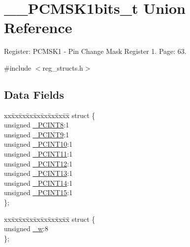 \hypertarget{union_____p_c_m_s_k1bits__t}{\section{\+\_\+\+\_\+\+P\+C\+M\+S\+K1bits\+\_\+t Union Reference}
\label{union_____p_c_m_s_k1bits__t}
}


Register\+: P\+C\+M\+S\+K1 -\/ Pin Change Mask Register 1. Page\+: 63.  




{\ttfamily \#include $<$reg\+\_\+structs.\+h$>$}

\subsection*{Data Fields}
\begin{DoxyCompactItemize}
\item 
\begin{tabbing}
xx\=xx\=xx\=xx\=xx\=xx\=xx\=xx\=xx\=\kill
struct \{\\
\>unsigned \hyperlink{union_____p_c_m_s_k1bits__t_a04d644ab120173fc1d3809ee81f2bdcc}{\_PCINT8}:1\\
\>unsigned \hyperlink{union_____p_c_m_s_k1bits__t_aa6503f2b6bd360c27cb07c0e629e867e}{\_PCINT9}:1\\
\>unsigned \hyperlink{union_____p_c_m_s_k1bits__t_aaafc92648c78154a0e7087a3b94895af}{\_PCINT10}:1\\
\>unsigned \hyperlink{union_____p_c_m_s_k1bits__t_ac840e7c205be625181b8eed24e55607a}{\_PCINT11}:1\\
\>unsigned \hyperlink{union_____p_c_m_s_k1bits__t_af96f46cc69d6d9e5aacb61fd0470a7f2}{\_PCINT12}:1\\
\>unsigned \hyperlink{union_____p_c_m_s_k1bits__t_a0ab65c152df9fb1bf73ea4ba991a9125}{\_PCINT13}:1\\
\>unsigned \hyperlink{union_____p_c_m_s_k1bits__t_ae614d00964087e02ed1c577e831a5188}{\_PCINT14}:1\\
\>unsigned \hyperlink{union_____p_c_m_s_k1bits__t_a2edb9a4c576fa0aee6cd7e0ba6351fef}{\_PCINT15}:1\\
\}; \\

\end{tabbing}\item 
\begin{tabbing}
xx\=xx\=xx\=xx\=xx\=xx\=xx\=xx\=xx\=\kill
struct \{\\
\>unsigned \hyperlink{union_____p_c_m_s_k1bits__t_a318c7bc3e21c629bcbab7c9574db777d}{\_w}:8\\
\}; \\

\end{tabbing}\end{DoxyCompactItemize}


